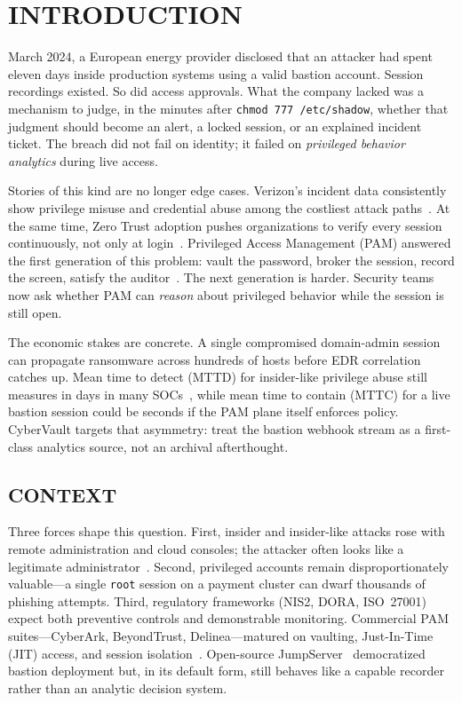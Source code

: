 \documentclass{ieeeaccess}
\begin{document}
\maketitle

\section{INTRODUCTION}
\label{sec:intro}

 March 2024, a European energy provider disclosed that an attacker had spent eleven days inside production systems using a valid bastion account. Session recordings existed. So did access approvals. What the company lacked was a mechanism to judge, in the minutes after \texttt{chmod 777 /etc/shadow}, whether that judgment should become an alert, a locked session, or an explained incident ticket. The breach did not fail on identity; it failed on \textit{privileged behavior analytics} during live access.

Stories of this kind are no longer edge cases. Verizon's incident data consistently show privilege misuse and credential abuse among the costliest attack paths~\cite{ref21}. At the same time, Zero Trust adoption pushes organizations to verify every session continuously, not only at login~\cite{ref4,ref22}. Privileged Access Management (PAM) answered the first generation of this problem: vault the password, broker the session, record the screen, satisfy the auditor~\cite{ref1,ref5}. The next generation is harder. Security teams now ask whether PAM can \textit{reason} about privileged behavior while the session is still open.

The economic stakes are concrete. A single compromised domain-admin session can propagate ransomware across hundreds of hosts before EDR correlation catches up. Mean time to detect (MTTD) for insider-like privilege abuse still measures in days in many SOCs~\cite{ref6,ref24}, while mean time to contain (MTTC) for a live bastion session could be seconds if the PAM plane itself enforces policy. CyberVault targets that asymmetry: treat the bastion webhook stream as a first-class analytics source, not an archival afterthought.

\subsection{CONTEXT}
Three forces shape this question. First, insider and insider-like attacks rose with remote administration and cloud consoles; the attacker often looks like a legitimate administrator~\cite{ref6}. Second, privileged accounts remain disproportionately valuable---a single \texttt{root} session on a payment cluster can dwarf thousands of phishing attempts. Third, regulatory frameworks (NIS2, DORA, ISO~27001) expect both preventive controls and demonstrable monitoring. Commercial PAM suites---CyberArk, BeyondTrust, Delinea---matured on vaulting, Just-In-Time (JIT) access, and session isolation~\cite{ref16,ref17,ref18}. Open-source JumpServer~\cite{ref5} democratized bastion deployment but, in its default form, still behaves like a capable recorder rather than an analytic decision system.
\end{document}
